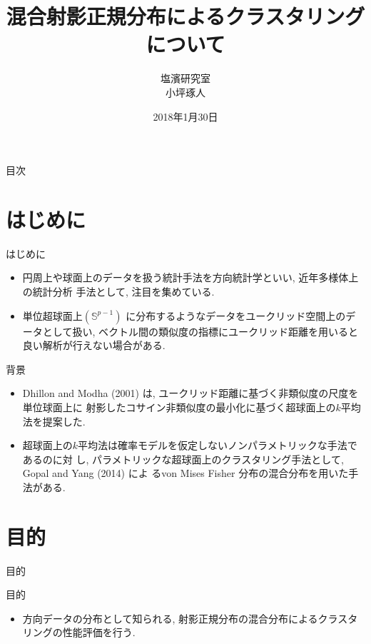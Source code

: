 \documentclass[dvipdfmx]{beamer} %
\title[タイトル]{混合射影正規分布によるクラスタリングについて}
\author[発表者名]{塩濱研究室\\ 小坪琢人}
\institute[所属]{東京理科大学\ 工学部経営工学科4年\\学籍番号 4414036}
\date[日付]{2018年1月30日}
\begin{document}
\begin{frame}[plain]
\titlepage
\end{frame}

\begin{frame}{目次}
\tableofcontents
\end{frame}

\section{はじめに}
\begin{frame}{はじめに}

\begin{itemize}

\item 
円周上や球面上のデータを扱う統計手法を方向統計学といい, 近年多様体上の統計分析
手法として, 注目を集めている.

\item 
単位超球面上$(\mathbb{S}^{p-1})$ に分布するようなデータをユークリッド空間上のデータとして扱い, ベクトル間の類似度の指標にユークリッド距離を用いると良い解析が行えない場合がある.

\end{itemize}

\end{frame}

\begin{frame}{背景}

\begin{itemize}

\item 
Dhillon and Modha (2001) は, ユークリッド距離に基づく非類似度の尺度を単位球面上に
射影したコサイン非類似度の最小化に基づく超球面上の$k$平均法を提案した.

\item  
超球面上の$k$平均法は確率モデルを仮定しないノンパラメトリックな手法であるのに対
し, パラメトリックな超球面上のクラスタリング手法として, Gopal and Yang (2014) によ
るvon Mises Fisher 分布の混合分布を用いた手法がある.

\end{itemize}

\end{frame}

\section{目的}
\begin{frame}{目的}
\begin{block}{目的}
\begin{itemize}

\item
方向データの分布として知られる, 射影正規分布の混合分布によるクラスタリングの性能評価を行う.

\end{itemize}
\end{block}
\end{frame}
\end{document}

